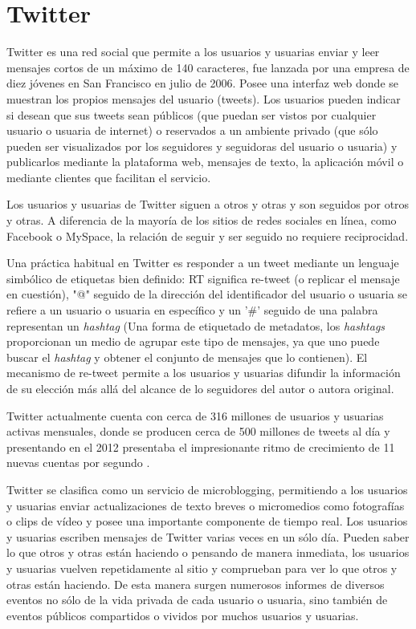 \section{Twitter}

Twitter es una red social que permite a los usuarios y usuarias enviar y leer mensajes cortos de un máximo de 140 caracteres, fue lanzada por una empresa de diez jóvenes en San Francisco en julio de 2006. Posee una interfaz web donde se muestran los propios mensajes del usuario (tweets). Los usuarios pueden indicar si desean que sus tweets sean públicos (que puedan ser vistos por cualquier usuario o usuaria de internet) o reservados a un ambiente privado (que sólo pueden ser visualizados por los seguidores y seguidoras del usuario o usuaria) y publicarlos mediante la plataforma web, mensajes de texto, la aplicación móvil o mediante clientes que facilitan el servicio.

Los usuarios y usuarias de Twitter siguen a otros y otras y son seguidos por otros y otras. A diferencia de la mayoría de los sitios de redes sociales en línea, como Facebook o MySpace, la relación de seguir y ser seguido no requiere reciprocidad. 

Una práctica habitual en Twitter es responder a un tweet mediante un lenguaje simbólico de etiquetas bien definido: RT significa re-tweet (o replicar el mensaje en cuestión), "@" seguido de la dirección del identificador del usuario o usuaria se refiere a un usuario o usuaria en específico y un '\#' seguido de una palabra representan un \emph{hashtag} (Una forma de etiquetado de metadatos, los \emph{hashtags} proporcionan un medio de agrupar este tipo de mensajes, ya que uno puede buscar el \emph{hashtag} y obtener el conjunto de mensajes que lo contienen). El mecanismo de re-tweet permite a los usuarios y usuarias difundir la información de su elección más allá del alcance de lo seguidores del autor o autora original.

Twitter actualmente cuenta con cerca de 316 millones de usuarios y usuarias activas mensuales, donde se producen cerca de 500 millones de tweets al día \cite{cifrasTwitter} y presentando en el 2012 presentaba el impresionante ritmo de crecimiento de 11 nuevas cuentas por segundo \cite{infografiasLabs}.

Twitter se clasifica como un servicio de microblogging, permitiendo a los usuarios y usuarias enviar actualizaciones de texto breves o micromedios como fotografías o clips de vídeo y posee una importante componente de tiempo real. Los usuarios y usuarias escriben mensajes de Twitter varias veces en un sólo día. Pueden saber lo que otros y otras están haciendo o pensando de manera inmediata, los usuarios y usuarias vuelven repetidamente al sitio y comprueban para ver lo que otros y otras están haciendo. De esta manera surgen numerosos informes de diversos eventos no sólo de la vida privada de cada usuario o usuaria, sino también de eventos públicos compartidos o vividos por muchos usuarios y usuarias.

